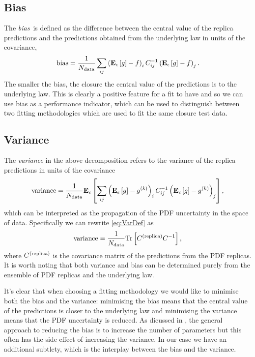 \subsection{Bias}

The {\em bias}\ is defined as the difference between the central value of the
replica predictions and the predictions obtained from the underlying law in
units of the covariance, \ie 
\begin{equation}
    \label{eq:BiasDef}
    {\rm bias} = \frac{1}{N_{\rm data}} \sum_{ij} \left( \mathbf{E}_{\epsilon}\left[ g \right] - f \right)_i C^{-1}_{ij} \left( \mathbf{E}_{\epsilon}\left[ g \right] - f \right)_j.
\end{equation}
The smaller the bias, the closure the central value of the predictions is to
the underlying law. This is clearly a positive feature for a fit to have and so
we can use bias as a performance indicator, which can be used to distinguish
between two fitting methodologies which are used to fit the same closure test
data.

\subsection{Variance}

The {\em variance} in the above decomposition refers to the variance of the
replica predictions in units of the covariance
\begin{equation}
    \label{eq:VarDef}
    {\rm variance} = \frac{1}{N_{\rm data}} \mathbf{E}_{\epsilon}\left[  \sum_{ij} \left( \mathbf{E}_{\epsilon}\left[ g \right] - g^{(k)}\right)_{i} C^{-1}_{ij} \left( \mathbf{E}_{\epsilon}\left[ g \right] - g^{(k)}\right)_{j} \right],
\end{equation}
which can be interpreted as the propagation of the PDF uncertainty in the space
of data. Specifically we can rewrite \eqref{eq:VarDef} as
\begin{equation}
    \label{eq:VarDefalternative}
    {\rm variance} = \frac{1}{N_{\rm data}} {\rm Tr} \left[ C^{(\rm replica)} C^{-1}_{} \right],
\end{equation}
where $C^{(\rm replica)}$ is the covariance matrix of the predictions
from the PDF replicas.
It is worth noting that both variance and bias can be determined
purely from the ensemble of PDF replicas and the underlying law.

It's clear that when choosing a fitting methodology we would like to minimise
both the bias and the variance: minimising the bias means that the central
value of the predictions is closer to the underlying law and minimising
the variance means that the PDF uncertainty is reduced. As dicussed in \cite{mlforphysics},
the general approach to reducing the bias is to
increase the number of parameters but this often has the side effect of
increasing the variance. In our case we have an additional subtlety, which is
the interplay between the bias and the variance.

